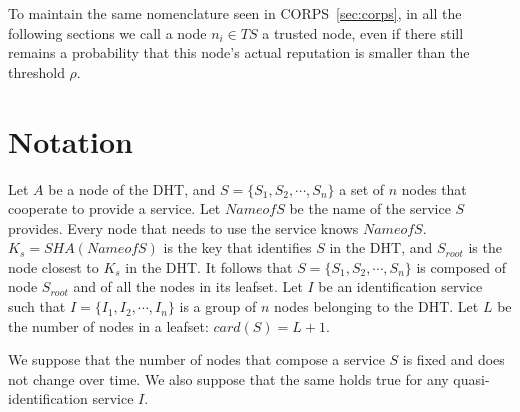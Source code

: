 To maintain the same nomenclature seen in CORPS~\ref{sec:corps}, in all the following sections
we call a node $n_i \in TS$ a trusted node, even if there still remains a
probability that this node's actual reputation is smaller than the threshold
$\rho$.

\section{Notation}

Let $A$ be a node of the DHT, and $S = \{S_1, S_2, \cdots, S_n\}$ a set of $n$
nodes that cooperate to provide a service. Let $NameofS$ be the name of the service
$S$ provides. Every node that needs to use the service knows $NameofS$. $K_s =
SHA(NameofS)$ is the key that identifies $S$ in the DHT, and $S_{root}$ is the node
closest to $K_s$ in the DHT. It follows that $S = \{S_1, S_2, \cdots, S_n\}$ is
composed of node $S_{root}$ and of all the nodes in its leafset. Let $I$ be an
identification service such that $I = \{ I_1, I_2, \cdots, I_n\}$ is a group of
$n$ nodes belonging to the DHT. Let $L$ be the number of nodes in a
leafset: $card(S) = L + 1$.



We suppose that the number of nodes that compose a service $S$ is fixed and does
not change over time. We also suppose that the same holds true for any
quasi-identification service $I$.
